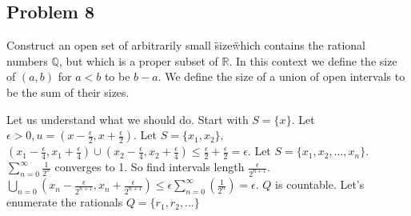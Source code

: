 \documentclass[11pt]{article}
\begin{document}
\subsection*{Problem 8}
Construct an open set of arbitrarily small \"size\" which contains the rational numbers $\mathbb{Q}$, but which is a proper subset of $\mathbb{R}$. In this context we define the size of $(a,b)$ for $a < b$ to be $b-a$. We define the size of a union of open intervals to be the sum of their sizes.

\begin{solution}
  $ $\\
  Let us understand what we should do. Start with $S=\{ x\}$. Let $\epsilon > 0, u = (x-\frac{\epsilon}{2}, x+\frac{\epsilon}{2})$. Let $S=\{ x_1, x_2\}$, $(x_1 - \frac{\epsilon}{4}, x_1 + \frac{\epsilon}{4}) \cup (x_2 - \frac{\epsilon}{4}, x_2 + \frac{\epsilon}{4}) \leq \frac{\epsilon}{2} + \frac{\epsilon}{2} = \epsilon$. Let $S=\{ x_1, x_2, \dots, x_n\}$. $\sum_{n=0}^{\infty}{\frac{1}{2^n}}$ converges to 1. So find intervals length $\frac{\epsilon}{2^{n+1}}$. $\bigcup_{n=0}(x_n-\frac{\epsilon}{2^{n+1}}, x_n + \frac{\epsilon}{2^{n+1}}) \leq \epsilon \sum_{n=0}^{\infty}(\frac{1}{2^n}) = \epsilon$. $Q$ is countable. Let's enumerate the rationals $Q = \{ r_1, r_2, \dots\}$

\end{solution}






\end{document}

